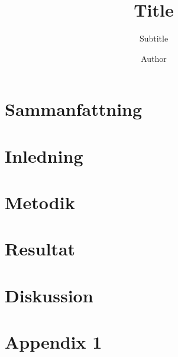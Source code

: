 \documentclass{aplreport}
\title{Title}
\subtitle{Subtitle}
\author{Author}
\begin{document}
\maketitlepages

\section{Sammanfattning}
\label{sec:summary}

\section{Inledning}
\label{sec:introduction}

\section{Metodik}
\label{sec:method}

\section{Resultat}
\label{sec:results}

\section{Diskussion}
\label{sec:diskussion}




\makeappendix

\section{Appendix 1}
\label{sec:appendix1}
\end{document}
